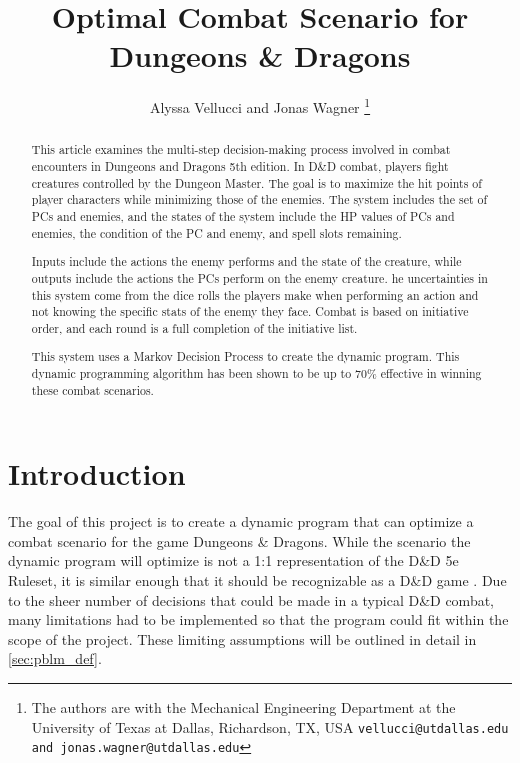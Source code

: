 \documentclass[letterpaper, 10 pt, conference]{ieeeconf}
\title{
    \LARGE \bf
    Optimal Combat Scenario for Dungeons \& Dragons
}
\author{
    Alyssa Vellucci and Jonas Wagner
    \thanks{
        The authors are with the Mechanical Engineering Department at the University of Texas at Dallas, Richardson, TX, USA 
    {\tt\small vellucci@utdallas.edu and jonas.wagner@utdallas.edu}
    }
}
\begin{document}
\maketitle
\begin{abstract}

    This article examines the multi-step decision-making process involved in combat encounters in Dungeons and Dragons 5th edition. 
    In D\&D combat, players fight creatures controlled by the Dungeon Master. 
    The goal is to maximize the hit points of player characters while minimizing those of the enemies. 
    The system includes the set of PCs and enemies, and the states of the system include the HP values of PCs and enemies, the condition of the PC and enemy, and spell slots remaining.

    Inputs include the actions the enemy performs and the state of the creature, while outputs include the actions the PCs perform on the enemy creature. 
    he uncertainties in this system come from the dice rolls the players make when performing an action and not knowing the specific stats of the enemy they face. 
    Combat is based on initiative order, and each round is a full completion of the initiative list.

    This system uses a Markov Decision Process to create the dynamic program.  
    This dynamic programming algorithm has been shown to be up to 70\% effective in winning these combat scenarios.


\end{abstract}


\section{Introduction}
The goal of this project is to create a dynamic program that can optimize a combat scenario for the game Dungeons \& Dragons. 
While the scenario the dynamic program will 
optimize is not a 1:1 representation of the D\&D 5e Ruleset, it is similar enough that it should be recognizable as a D\&D game \cite{dnd5e, dnd_wizards, dnd_wiki}.
Due to the sheer number of decisions that could be made in a typical D\&D combat, many limitations had to be implemented so that the program could fit within the scope of the project. 
These limiting assumptions will be outlined
in detail in \cref{sec:pblm_def}. 
\end{document}
